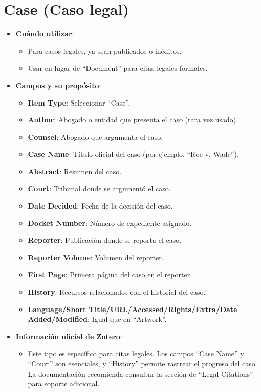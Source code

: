 \documentclass[
  jou,
  floatsintext,
  longtable,
  a4paper,
  nolmodern,
  notxfonts,
  notimes,
  12pt,
  colorlinks=true,linkcolor=blue,citecolor=blue,urlcolor=blue]{apa7}
\providecommand{\tightlist}{%
  \setlength{\itemsep}{0pt}\setlength{\parskip}{0pt}}
\begin{document}
\section{Case (Caso legal)}\label{case-caso-legal}

\begin{itemize}
\tightlist
\item
  \textbf{Cuándo utilizar}:

  \begin{itemize}
  \tightlist
  \item
    Para casos legales, ya sean publicados o inéditos.
  \item
    Usar en lugar de ``Document'' para citas legales formales.
  \end{itemize}
\item
  \textbf{Campos y su propósito}:

  \begin{itemize}
  \tightlist
  \item
    \textbf{Item Type}: Seleccionar ``Case''.
  \item
    \textbf{Author}: Abogado o entidad que presenta el caso (rara vez
    usado).
  \item
    \textbf{Counsel}: Abogado que argumenta el caso.
  \item
    \textbf{Case Name}: Título oficial del caso (por ejemplo, ``Roe v.
    Wade'').
  \item
    \textbf{Abstract}: Resumen del caso.
  \item
    \textbf{Court}: Tribunal donde se argumentó el caso.
  \item
    \textbf{Date Decided}: Fecha de la decisión del caso.
  \item
    \textbf{Docket Number}: Número de expediente asignado.
  \item
    \textbf{Reporter}: Publicación donde se reporta el caso.
  \item
    \textbf{Reporter Volume}: Volumen del reporter.
  \item
    \textbf{First Page}: Primera página del caso en el reporter.
  \item
    \textbf{History}: Recursos relacionados con el historial del caso.
  \item
    \textbf{Language/Short Title/URL/Accessed/Rights/Extra/Date
    Added/Modified}: Igual que en ``Artwork''.
  \end{itemize}
\item
  \textbf{Información oficial de Zotero}:

  \begin{itemize}
  \tightlist
  \item
    Este tipo es específico para citas legales. Los campos ``Case Name''
    y ``Court'' son esenciales, y ``History'' permite rastrear el
    progreso del caso. La documentación recomienda consultar la sección
    de ``Legal Citations'' para soporte adicional.
  \end{itemize}
\end{itemize}
\end{document}
